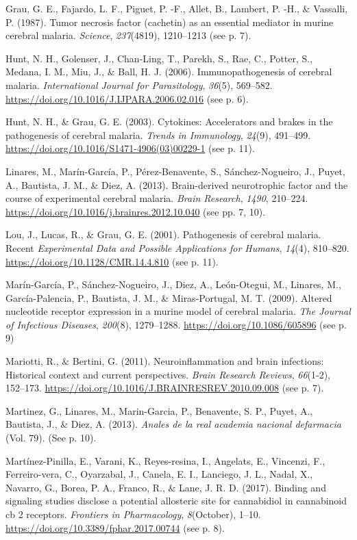 \documentclass[empirical, authordate, issue]{jote-new-article}
\begin{document}
Grau, G. E., Fajardo, L. F., Piguet, P. -F., Allet, B., Lambert, P. -H., \& Vassalli, P. (1987). Tumor necrosis factor (cachetin) as an essential mediator in murine cerebral malaria. \emph{Science}, \emph{237}(4819), 1210–1213 (see p. 7).

Hunt, N. H., Golenser, J., Chan-Ling, T., Parekh, S., Rae, C., Potter, S., Medana, I. M., Miu, J., \& Ball, H. J. (2006). Immunopathogenesis of cerebral malaria. \emph{International Journal for Parasitology}, \emph{36}(5), 569–582. \url{https://doi.org/10.1016/J.IJPARA.2006.02.016} (see p. 6).

Hunt, N. H., \& Grau, G. E. (2003). Cytokines: Accelerators and brakes in the pathogenesis of cerebral malaria. \emph{Trends in Immunology}, \emph{24}(9), 491–499. \url{https://doi.org/10.1016/S1471-4906(03)00229-1} (see p. 11).

Linares, M., Marín-García, P., Pérez-Benavente, S., Sánchez-Nogueiro, J., Puyet, A., Bautista, J. M., \& Diez, A. (2013). Brain-derived neurotrophic factor and the course of experimental cerebral malaria. \emph{Brain Research}, \emph{1490}, 210–224. \url{https://doi.org/10.1016/j.brainres.2012.10.040} (see pp. 7, 10).

Lou, J., Lucas, R., \& Grau, G. E. (2001). Pathogenesis of cerebral malaria. Recent \emph{Experimental Data and Possible Applications for Humans}, \emph{14}(4), 810–820. \url{https://doi.org/10.1128/CMR.14.4.810} (see p. 11).

Marín-García, P., Sánchez-Nogueiro, J., Diez, A., León-Otegui, M., Linares, M., García-Palencia, P., Bautista, J. M., \& Miras-Portugal, M. T. (2009). Altered nucleotide receptor expression in a murine model of cerebral malaria. \emph{The Journal of Infectious Diseases}, \emph{200}(8), 1279–1288. \url{https://doi.org/10.1086/605896} (see p. 9)

Mariotti, R., \& Bertini, G. (2011). Neuroinflammation and brain infections: Historical context and current perspectives. \emph{Brain Research Reviews}, \emph{66}(1-2), 152–173. \url{https://doi.org/10.1016/J.BRAINRESREV.2010.09.008} (see p. 7).

Martinez, G., Linares, M., Marin-Garcia, P., Benavente, S. P., Puyet, A., Bautista, J., \& Diez, A. (2013). \emph{Anales de la real academia nacional defarmacia} (Vol. 79). (See p. 10).

Martínez-Pinilla, E., Varani, K., Reyes-resina, I., Angelats, E., Vincenzi, F., Ferreiro-vera, C., Oyarzabal, J., Canela, E. I., Lanciego, J. L., Nadal, X., Navarro, G., Borea, P. A., Franco, R., \& Lane, J. R. D. (2017). Binding and signaling studies disclose a potential allosteric site for cannabidiol in cannabinoid cb 2 receptors. \emph{Frontiers in Pharmacology}, \emph{8}(October), 1–10. \url{https://doi.org/10.3389/fphar.2017.00744} (see p. 8).
\end{document}
